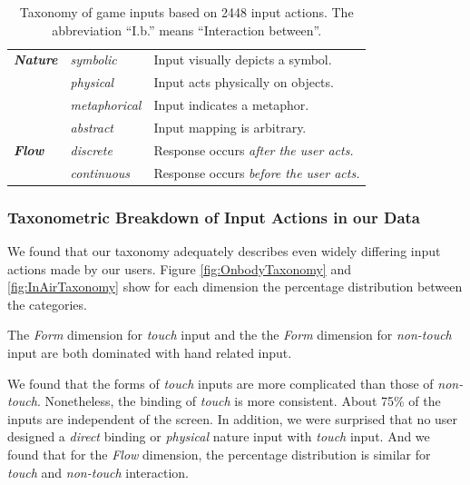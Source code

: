 \documentclass{sigchi}
\begin{document}
\begin{table}
\begin{adjustwidth}{-0.5cm}{}
\begin{tabular}{|l|l|l|}
        \textbf{\em{Nature}} & \em{symbolic} & Input visually depicts a symbol.\\ \cline{2-3} 
             & \em{physical} & Input acts physically on objects.\\ \cline{2-3} 
             & \em{metaphorical} & Input indicates a metaphor.\\ \cline{2-3} 
             & \em{abstract} & Input mapping is arbitrary.\\
      \Xhline{4\arrayrulewidth}
        \textbf{\em{Flow}} & \em{discrete} & Response occurs \em{after} the user acts.\\ \cline{2-3} 
             & \em{continuous} & Response occurs \em{before} the user acts.\\
      \hline
    \end{tabular}
    \caption{Taxonomy of game inputs based on 2448 input actions. The abbreviation ``I.b.'' means ``Interaction between''.}
    \label{tab:taxonomy}
    \end{adjustwidth}
  \end{table}
 

 \subsubsection{Taxonometric Breakdown of Input Actions in our Data}
We found that our taxonomy adequately describes even widely differing input actions made by our users. Figure \ref{fig:OnbodyTaxonomy} and \ref{fig:InAirTaxonomy} show for each dimension the percentage distribution between the categories.

The \emph{Form} dimension for \emph{touch} input and the the \emph{Form} dimension for \emph{non-touch} input are both dominated with hand related input. 

We found that the forms of \emph{touch} inputs are more complicated than those of \emph{non-touch}. Nonetheless, the binding of \emph{touch} is more consistent. About 75\% of the inputs are independent of the screen. In addition, we were surprised that no user designed a \emph{direct} binding or \emph{physical} nature input with \emph{touch} input. And we found that for the \emph{Flow} dimension, the percentage distribution is similar for \emph{touch} and \emph{non-touch} interaction.
\end{document}
